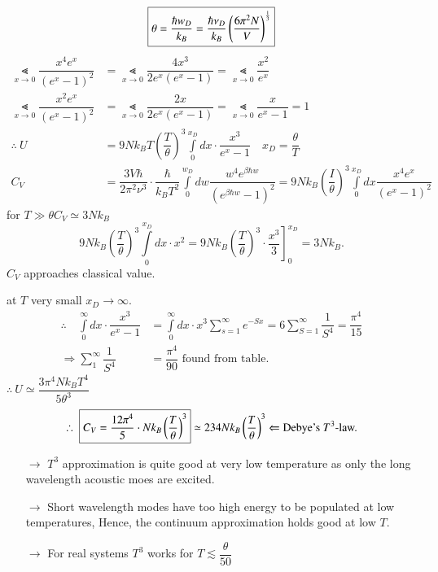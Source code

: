 \chapter[Lecture 20]{}\label{lec20}

$$
\fbox{$\theta=\dfrac{\hbar w_{D}}{k_{B}}=\dfrac{\hbar \nu_{D}}{k_{B}}\left(\dfrac{6\pi^{2}N}{V}\right)^{\frac{1}{3}}$}
$$
\begin{align*}
\Lt\limits_{x\to 0}\dfrac{x^{4}e^{x}}{(e^{x}-1)^{2}} &= \Lt\limits_{x\to 0}\dfrac{4x^{3}}{2e^{x}(e^{x}-1)}=\Lt\limits_{x\to 0}\dfrac{x^{2}}{e^{x}}\\[3pt]
\Lt\limits_{x\to 0}\dfrac{x^{2}e^{x}}{(e^{x}-1)^{2}} &= \Lt\limits_{x\to 0}\dfrac{2x}{2e^{x}(e^{x}-1)}=\Lt\limits_{x\to 0}\dfrac{x}{e^{x}-1}=1\\[3pt]
\therefore \ U &= 9Nk_{B}T\left(\dfrac{T}{\theta}\right)^{3}\int\limits^{x_{D}}_{0}dx\cdot \dfrac{x^{3}}{e^{x}-1}\quad x_{D}=\dfrac{\theta}{T}\\[3pt]
C_{V} &= \dfrac{3V\hbar}{2\pi^{2}\nu^{3}}\cdot \dfrac{\hbar}{k_{B}T^{2}}\int\limits^{w_{D}}_{0}dw\dfrac{w^{4}e^{\beta\hbar w}}{(e^{\beta\hbar w}-1)^{2}}=9Nk_{B}\left(\dfrac{I}{\theta}\right)^{3}\int\limits^{x_{D}}_{0}dx\dfrac{x^{4}e^{x}}{(e^{x}-1)^{2}}
\end{align*}
for $T\gg \theta$\quad $C_{V}\simeq 3Nk_{B}$
$$
9Nk_{B}\left(\dfrac{T}{\theta}\right)^{3}\int\limits^{x_{D}}_{0}dx\cdot x^{2}=9Nk_{B}\left(\dfrac{T}{\theta}\right)^{3}\cdot \left.\dfrac{x^{3}}{3}\right]^{x_{D}}_{0}=3Nk_{B}.
$$
$C_{V}$ approaches classical value.

at $T$ very small $x_{D}\to \infty$.
\begin{align*}
\therefore\quad \int\limits^{\infty}_{0}dx\cdot \dfrac{x^{3}}{e^{x}-1} &=\int\limits^{\infty}_{0}dx\cdot x^{3}\sum\limits^{\infty}_{s=1}e^{-Sx}=6\sum\limits^{\infty}_{S=1}\dfrac{1}{S^{4}}=\dfrac{\pi^{4}}{15}\\[3pt]
\Rightarrow \sum\limits^{\infty}_{1}\dfrac{1}{S^{4}} &= \dfrac{\pi^{4}}{90}\text{ found from table.}
\end{align*}
$\therefore \ U\simeq \dfrac{3\pi^{4}Nk_{B}T^{4}}{5\theta^{3}}$
$$
\therefore \ \fbox{$C_{V}=\dfrac{12\pi^{4}}{5}\cdot Nk_{B}\left(\dfrac{T}{\theta}\right)^{3}$} \simeq 234Nk_{B}\left(\dfrac{T}{\theta}\right)^{3}\Leftarrow \text{Debye's $T^{3}$-law.}
$$
\begin{itemize}
\itemsep=0pt
\item[$\to$] $T^{3}$ approximation is quite good at very low temperature as only the long wavelength acoustic moes are excited.

\item[$\to$] Short wavelength modes have too high energy to be populated at low temperatures, Hence, the continuum approximation holds good at low $T$.

\item[$\to$] For real systems $T^{3}$ works for $T\lesssim \dfrac{\theta}{50}$
\end{itemize}


